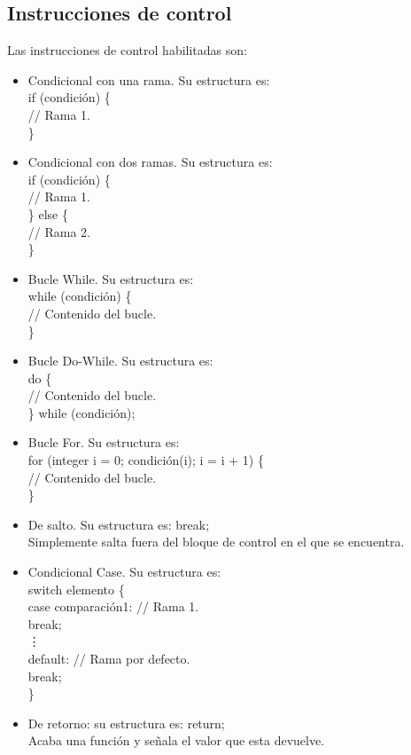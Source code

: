 \documentclass[a4paper, 12pt]{article}
\begin{document}
\subsection{Instrucciones de control}
Las instrucciones de control habilitadas son:
\begin{itemize}
\item Condicional con una rama. Su estructura es:\\
		if (condición) \{ \\
			// Rama 1.\\
		\}
\item Condicional con dos ramas. Su estructura es:\\
		if (condición) \{ \\
			// Rama 1.\\
		\} else \{ \\
			// Rama 2.\\
		\}
\item Bucle While. Su estructura es:\\
		while (condición) \{ \\
			// Contenido del bucle.\\
		\}
\item Bucle Do-While. Su estructura es:\\
		 do \{ \\
			// Contenido del bucle.\\
		\} while (condición);
\item Bucle For. Su estructura es:\\
		for (integer i = 0; condición(i); i = i + 1) \{ \\
			// Contenido del bucle.\\
		\}
\item De salto. Su estructura es: break;\\
Simplemente salta fuera del bloque de control en el que se encuentra.
\item Condicional Case. Su estructura es:\\
		switch elemento \{ \\
		case comparación1: // Rama 1.\\
			break;\\
			\vdots\\
		default: // Rama por defecto.\\
			break;\\
		\}
\item De retorno: su estructura es: return;\\
Acaba una función y señala el valor que esta devuelve.
\end{itemize}
\end{document}
